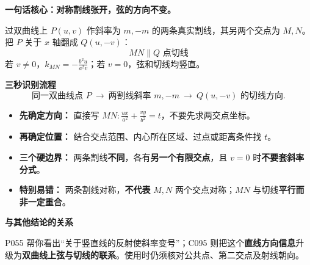 \clearpage
\begin{summarybox}
\textbf{\textcolor{CSummary}{一句话核心：对称割线张开，弦的方向不变。}}

过双曲线上 $P(u,v)$ 作斜率为 $m,-m$ 的两条真实割线，其另两个交点为 $M,N$。把 $P$ 关于 $x$ 轴翻成 $Q(u,-v)$：
\[
\boxed{MN\parallel Q\text{ 点切线}}
\]
若 $v\ne0$，$\displaystyle\boxed{k_{MN}=-\frac{b^2u}{a^2v}}$；若 $v=0$，弦和切线均竖直。

\medskip
\textbf{\textcolor{CSummary}{三秒识别流程}}
\[
\boxed{\text{同一双曲线点 }P}\ \longrightarrow\
\boxed{\text{两割线斜率 }m,-m}\ \longrightarrow\
\boxed{Q(u,-v)\text{ 的切线方向}}.
\]

\begin{itemize}[leftmargin=*,itemsep=0.42em]
 \item \textbf{先确定方向：} 直接写 $MN:\frac{ux}{a^2}+\frac{vy}{b^2}=t$，不要先求两交点坐标。
 \item \textbf{再确定位置：} 结合交点范围、内心所在区域、过点或距离条件找 $t$。
 \item \textbf{三个硬边界：} 两条割线\textbf{不同}，各有\textbf{另一个有限交点}，且 $v=0$ 时\textbf{不要套斜率分式}。
 \item \textbf{特别易错：} 两条割线对称，\textbf{不代表} $M,N$ 两个交点对称；$MN$ 与切线\textbf{平行而非一定重合}。
\end{itemize}

\medskip
\textbf{\textcolor{CSummary}{与其他结论的关系}}

P055 帮你看出“关于竖直线的反射使斜率变号”；C095 则把这个\textbf{直线方向信息}升级为\textbf{双曲线上弦与切线的联系}。使用时仍须核对公共点、第二交点及射线朝向。
\end{summarybox}
